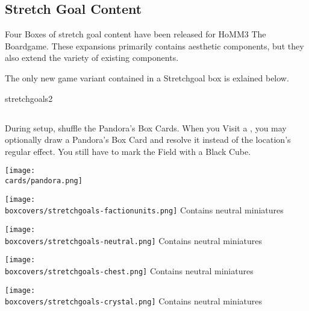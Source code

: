 \newpage
\begin{multicols*}{2}

\subsection*{Stretch Goal Content}

Four Boxes of stretch goal content have been released for HoMM3 The Boardgame.
These expansions primarily contains aesthetic components, but they also extend the variety of existing components.\par
\smallskip
The only new game variant contained in a Stretchgoal box is exlained below.

 \begin{expansion}{stretchgoals2}
   \subsection*{}
   During setup, shuffle the Pandora's Box Cards.
   When you Visit a , you may optionally draw a Pandora's Box Card and resolve it instead of the location's regular effect.
   You still have to mark the Field with a Black Cube.

   \medskip
   \begin{center}
     \texttt{[image: \\cards/pandora.png]}
   \end{center}
 \end{expansion}

 \begin{multicols}{2}
     \begin{center}
     \texttt{[image: \\boxcovers/stretchgoals-factionunits.png]}
     \footnotesize Contains neutral miniatures\par
     \vspace*{0.5em}
     \texttt{[image: \\boxcovers/stretchgoals-neutral.png]}
     \footnotesize Contains neutral miniatures\par

     \columnbreak
     \texttt{[image: \\boxcovers/stretchgoals-chest.png]}
     \footnotesize Contains neutral miniatures\par
     \vspace*{0.5em}
     \texttt{[image: \\boxcovers/stretchgoals-crystal.png]}
     \footnotesize Contains neutral miniatures\par
     \end{center}
  \end{multicols}
\columnbreak

\end{multicols*}
